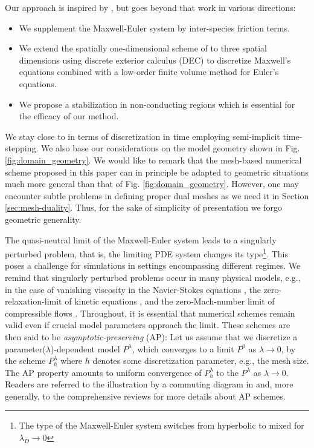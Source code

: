 \documentclass{article}
\begin{document}
Our approach is inspired by \cite{degond_2012}, but goes beyond that work in various directions:
\begin{itemize}
\item We supplement the Maxwell-Euler system by inter-species friction terms.
\item We extend the spatially one-dimensional scheme of \cite{degond_2012} to three
  spatial dimensions using discrete exterior calculus (DEC) to discretize Maxwell's
  equations combined with a low-order finite volume method for Euler's equations.
\item We propose a stabilization in non-conducting regions which is essential for the
  efficacy of our method.
\end{itemize}

We stay close to \cite{degond_2012} in terms of discretization in time employing
semi-implicit time-stepping. We also base our considerations on the model geometry shown
in Fig. \ref{fig:domain_geometry}. We would like to remark that the mesh-based numerical
scheme proposed in this paper can in principle be adapted to geometric situations much
more general than that of Fig. \ref{fig:domain_geometry}. However, one may encounter
subtle problems in defining proper dual meshes as we need it in Section
\ref{sec:mesh-duality}. Thus, for the sake of simplicity of presentation we forgo
geometric generality.

The quasi-neutral limit of the Maxwell-Euler system leads to a singularly perturbed
problem, that is, the limiting PDE system changes its type\footnote{The type of the
  Maxwell-Euler system switches from hyperbolic to mixed for $\lambda_{D}\to 0$}. This
poses a challenge for simulations in settings encompassing different regimes. We remind
that singularly perturbed problems occur in many physical models, e.g., in the case of
vanishing viscosity in the Navier-Stokes equations \cite{Kato_1984}, the
zero-relaxation-limit of kinetic equations \cite{jin_2010}, and the zero-Mach-number limit
of compressible flows \cite{degond_2007, haack_2010}. Throughout, it is essential that
numerical schemes remain valid even if crucial model parameters approach the limit. These
schemes are then said to be \emph{asymptotic-preserving} (AP): Let us assume that we
discretize a parameter($\lambda$)-dependent model $P^\lambda$, which converges to a limit
$P^0$ as $\lambda \rightarrow 0$, by the scheme $P^\lambda_h$ where $h$ denotes some
discretization parameter, e.g., the mesh size. The AP property amounts to uniform
convergence of $P^\lambda_h$ to the $P^\lambda$ as $\lambda\rightarrow0$. Readers are
referred to the illustration by a commuting diagram in \cite[][Fig. 1]{jin_2010} and, more
generally, to the comprehensive reviews \cite{jin_2010, degond_2017} for more details
about AP schemes.
\end{document}
